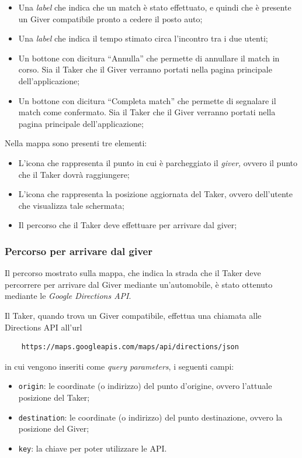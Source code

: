 \begin{itemize}
    \item Una \emph{label} che indica che un match è stato effettuato, e quindi che è presente un Giver compatibile pronto a cedere il posto auto;
    \item Una \emph{label} che indica il tempo stimato circa l'incontro tra i due utenti;
    \item Un bottone con dicitura ``Annulla'' che permette di annullare il match in corso. Sia il Taker che il Giver verranno portati nella pagina principale dell'applicazione;
    \item Un bottone con dicitura ``Completa match'' che permette di segnalare il match come confermato. Sia il Taker che il Giver verranno portati nella pagina principale dell'applicazione;
\end{itemize}
Nella mappa sono presenti tre elementi:

\begin{itemize}
    \item L'icona che rappresenta il punto in cui è parcheggiato il \emph{giver,} ovvero il punto che il Taker dovrà raggiungere;
    \item L'icona che rappresenta la posizione aggiornata del Taker, ovvero dell'utente che visualizza tale schermata;
    \item Il percorso che il Taker deve effettuare per arrivare dal giver;
\end{itemize}
\hypertarget{percorso-per-arrivare-dal-giver}{%
\subsubsection{Percorso per arrivare dal giver}\label{percorso-per-arrivare-dal-giver}}

Il percorso mostrato sulla mappa, che indica la strada che il Taker deve percorrere per arrivare dal Giver mediante un'automobile, è stato ottenuto mediante le \emph{Google Directions API}.

Il Taker, quando trova un Giver compatibile, effettua una chiamata alle Directions API all'url
\begin{verbatim}
    https://maps.googleapis.com/maps/api/directions/json
\end{verbatim}
in cui vengono inseriti come \textit{query parameters}, i seguenti campi:
\begin{itemize}
    \item \texttt{origin}: le coordinate (o indirizzo) del punto d'origine, ovvero l'attuale posizione del Taker;
    \item \texttt{destination}: le coordinate (o indirizzo) del punto destinazione, ovvero la posizione del Giver;
    \item \texttt{key}: la chiave per poter utilizzare le API.
\end{itemize}

